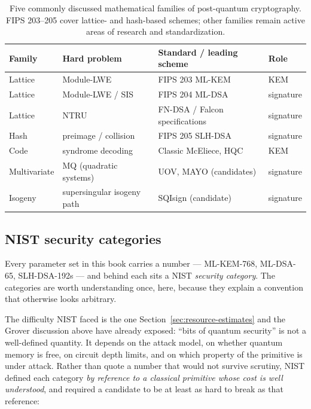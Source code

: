 \begin{table}[H]
\centering
\small
\begin{tabular}{llll}
\toprule
Family & Hard problem & Standard / leading scheme & Role \\
\midrule
Lattice & Module-LWE & FIPS 203 ML-KEM & KEM \\
Lattice & Module-LWE / SIS & FIPS 204 ML-DSA & signature \\
Lattice & NTRU & FN-DSA / Falcon specifications & signature \\
Hash & preimage / collision & FIPS 205 SLH-DSA & signature \\
Code & syndrome decoding & Classic McEliece, HQC & KEM \\
Multivariate & MQ (quadratic systems) & UOV, MAYO (candidates) & signature \\
Isogeny & supersingular isogeny path & SQIsign (candidate) & signature \\
\bottomrule
\end{tabular}
\caption{Five commonly discussed mathematical families of post-quantum cryptography. FIPS 203--205 cover lattice- and hash-based schemes; other families remain active areas of research and standardization.}
\label{tab:pqc-families}
\end{table}

\subsection*{NIST security categories}
\label{sec:nist-categories}

Every parameter set in this book carries a number --- ML-KEM-768, ML-DSA-65,
SLH-DSA-192s --- and behind each sits a NIST \emph{security category}. The
categories are worth understanding once, here, because they explain a convention
that otherwise looks arbitrary.

The difficulty NIST faced is the one Section~\ref{sec:resource-estimates} and the
Grover discussion above have already exposed: ``bits of quantum security'' is not
a well-defined quantity. It depends on the attack model, on whether quantum
memory is free, on circuit depth limits, and on which property of the primitive
is under attack. Rather than quote a number that would not survive scrutiny, NIST
defined each category \emph{by reference to a classical primitive whose cost is
well understood}, and required a candidate to be at least as hard to break as
that reference:

